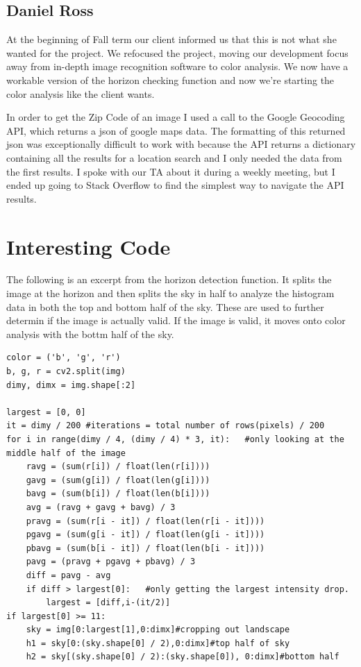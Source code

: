 \documentclass[onecolumn, draftclsnofoot,10pt, compsoc]{IEEEtran}
\begin{document}
\begin{singlespace}
		\subsection{Daniel Ross}
			At the beginning of Fall term our client informed us that this is not what she wanted for the project.
			We refocused the project, moving our development focus away from in-depth image recognition software to color analysis.
			We now have a workable version of the horizon checking function and now we're starting the color analysis like the client wants.

			In order to get the Zip Code of an image I used a call to the Google Geocoding API, which returns a json of google maps data.
			The formatting of this returned json was exceptionally difficult to work with because the API returns a dictionary containing all the results for a location search and I only needed the data from the first results.
			I spoke with our TA about it during a weekly meeting, but I ended up going to Stack Overflow to find the simplest way to navigate the API results.
		
	\section{Interesting Code}
		The following is an excerpt from the horizon detection function. It splits the image at the horizon and then splits the sky in half to analyze the histogram data in both the top and bottom half of the sky.
		These are used to further determin if the image is actually valid.
		If the image is valid, it moves onto color analysis with the bottm half of the sky.
		\begin{lstlisting}
color = ('b', 'g', 'r')
b, g, r = cv2.split(img)
dimy, dimx = img.shape[:2]

largest = [0, 0]
it = dimy / 200 #iterations = total number of rows(pixels) / 200
for i in range(dimy / 4, (dimy / 4) * 3, it):   #only looking at the middle half of the image
	ravg = (sum(r[i]) / float(len(r[i])))
	gavg = (sum(g[i]) / float(len(g[i])))
	bavg = (sum(b[i]) / float(len(b[i])))
	avg = (ravg + gavg + bavg) / 3
	pravg = (sum(r[i - it]) / float(len(r[i - it])))
	pgavg = (sum(g[i - it]) / float(len(g[i - it])))
	pbavg = (sum(b[i - it]) / float(len(b[i - it])))
	pavg = (pravg + pgavg + pbavg) / 3
	diff = pavg - avg
	if diff > largest[0]:   #only getting the largest intensity drop.
		largest = [diff,i-(it/2)]
if largest[0] >= 11:
	sky = img[0:largest[1],0:dimx]#cropping out landscape
	h1 = sky[0:(sky.shape[0] / 2),0:dimx]#top half of sky
	h2 = sky[(sky.shape[0] / 2):(sky.shape[0]), 0:dimx]#bottom half


\end{lstlisting}
\end{singlespace}
\end{document}
